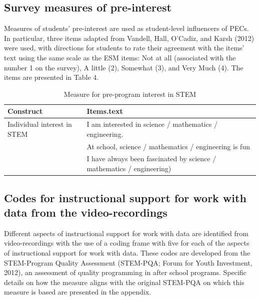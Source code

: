 \documentclass[]{msu-thesis}
\theoremstyle{definition}
\theoremstyle{definition}
\theoremstyle{definition}
\theoremstyle{remark}
\begin{document}
\subsection{Survey measures of
pre-interest}\label{survey-measures-of-pre-interest}

Measures of students' pre-interest are used as student-level influencers
of PECs. In particular, three items adapted from Vandell, Hall, O'Cadiz,
and Karsh (2012) were used, with directions for students to rate their
agreement with the items' text using the same scale as the ESM items:
Not at all (associated with the number 1 on the survey), A little (2),
Somewhat (3), and Very Much (4). The items are presented in Table 4.

\begin{table}

\caption{\label{tab:unnamed-chunk-6}Measure for pre-program interest in STEM}
\centering
\begin{tabular}[t]{ll}
\toprule
Construct & Items.text\\
\midrule
Individual interest in STEM & I am interested in science / mathematics / engineering.\\
 & At school, science / mathematics / engineering is fun\\
 & I have always been fascinated by science / mathematics / engineering)\\
\bottomrule
\end{tabular}
\end{table}

\subsection{Codes for instructional support for work with data from the
video-recordings}\label{codes-for-instructional-support-for-work-with-data-from-the-video-recordings}

Different aspects of instructional support for work with data are
identified from video-recordings with the use of a coding frame with
five for each of the aspects of instructional support for work with
data. These codes are developed from the STEM-Program Quality Assessment
(STEM-PQA; Forum for Youth Investment, 2012), an assessment of quality
programming in after school programs. Specific details on how the
measure aligns with the original STEM-PQA on which this measure is based
are presented in the appendix.
\end{document}
